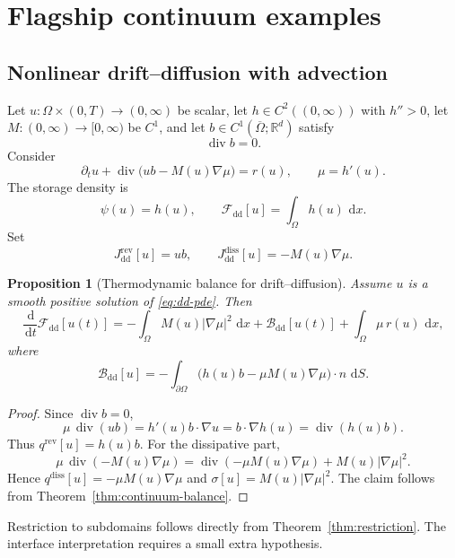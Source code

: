 \documentclass[11pt]{article}
\newtheorem{proposition}[theorem]{Proposition}
\newcommand{\R}{\mathbb{R}}
\newcommand{\Om}{\Omega}
\newcommand{\pa}{\partial}
\newcommand{\cl}{\overline}
\newcommand{\grad}{\nabla}
\newcommand{\diver}{\operatorname{div}}
\newcommand{\dd}{\,\mathrm{d}}
\newcommand{\F}{\mathcal{F}}
\newcommand{\Bnd}{\mathcal{B}}
\begin{document}
\section{Flagship continuum examples}

\subsection{Nonlinear drift--diffusion with advection}

Let \(u:\Om\times(0,T)\to (0,\infty)\) be scalar, let \(h\in C^2((0,\infty))\) with
\(h''>0\), let \(M:(0,\infty)\to [0,\infty)\) be \(C^1\), and let
\(b\in C^1(\cl{\Om};\R^d)\) satisfy
\begin{equation}\label{eq:b-divfree}
\diver b=0.
\end{equation}
Consider
\begin{equation}\label{eq:dd-pde}
\partial_t u + \diver\bigl(ub - M(u)\grad \mu\bigr)=r(u),
\qquad
\mu=h'(u).
\end{equation}
The storage density is
\[
\psi(u)=h(u),
\qquad
\F_{\mathrm{dd}}[u]=\int_\Om h(u)\,\dd x.
\]
Set
\[
J_{\mathrm{dd}}^{\mathrm{rev}}[u]=ub,
\qquad
J_{\mathrm{dd}}^{\mathrm{diss}}[u]=-M(u)\grad \mu.
\]

\begin{proposition}[Thermodynamic balance for drift--diffusion]
Assume \(u\) is a smooth positive solution of \eqref{eq:dd-pde}. Then
\begin{equation}\label{eq:dd-balance}
\frac{\dd}{\dd t}\F_{\mathrm{dd}}[u(t)]
=
-\int_\Om M(u)|\grad \mu|^2\,\dd x
+\Bnd_{\mathrm{dd}}[u(t)]
+\int_\Om \mu\,r(u)\,\dd x,
\end{equation}
where
\begin{equation}\label{eq:dd-bnd}
\Bnd_{\mathrm{dd}}[u]
=
-\int_{\pa\Om}\bigl(h(u)b-\mu M(u)\grad \mu\bigr)\cdot n\,\dd S.
\end{equation}
\end{proposition}

\begin{proof}
Since \(\diver b=0\),
\[
\mu\,\diver(ub)=h'(u)b\cdot \grad u = b\cdot \grad h(u)=\diver(h(u)b).
\]
Thus \(q^{\mathrm{rev}}[u]=h(u)b\). For the dissipative part,
\[
\mu\,\diver(-M(u)\grad \mu)
=
\diver(-\mu M(u)\grad \mu) + M(u)|\grad \mu|^2.
\]
Hence \(q^{\mathrm{diss}}[u]=-\mu M(u)\grad \mu\) and
\(\sigma[u]=M(u)|\grad \mu|^2\). The claim follows from
Theorem~\ref{thm:continuum-balance}.
\end{proof}

Restriction to subdomains follows directly from Theorem~\ref{thm:restriction}. The
interface interpretation requires a small extra hypothesis.
\end{document}

